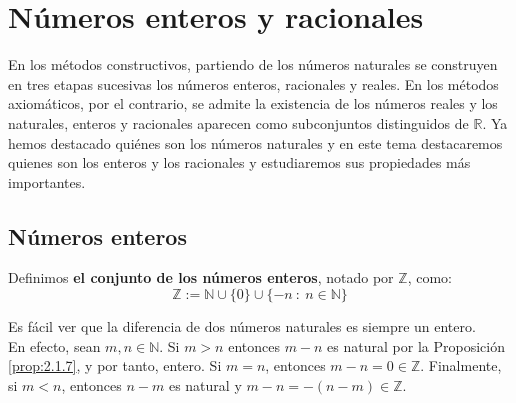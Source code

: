 \chapter{Números enteros y racionales}\label{chp:Tema3}

En los métodos constructivos, partiendo de los números naturales se construyen en tres etapas sucesivas los números enteros, racionales y reales. En los métodos axiomáticos, por el contrario, se admite la existencia de los números reales y los naturales, enteros y racionales aparecen como subconjuntos distinguidos de $\mathbb{R}$. Ya hemos destacado quiénes son los números naturales y en este tema destacaremos quienes son los enteros y los racionales y estudiaremos sus propiedades más importantes.

    
\section{Números enteros}

\begin{definicion}
    Definimos \textbf{el conjunto de los números enteros}, notado por $\mathbb{Z}$, como:
    \begin{equation*}
        \mathbb{Z} := \mathbb{N} \cup \{0\} \cup \{-n~:~n \in \mathbb{N}\}
    \end{equation*}
\end{definicion}

Es fácil ver que la diferencia de dos números naturales es siempre un entero.\\

En efecto, sean $m,n \in \mathbb{N}$. Si $m > n$ entonces $m-n$ es natural por la Proposición \ref{prop:2.1.7}, y por tanto, entero.
Si $m=n$, entonces  $m-n = 0 \in \mathbb{Z}$. Finalmente, si $m < n$, entonces $n-m$ es natural y $m-n=-(n-m) \in \mathbb{Z}$.\\

